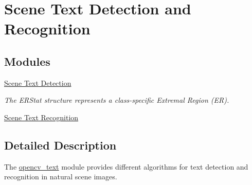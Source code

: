 \hypertarget{group__text}{}\section{Scene Text Detection and Recognition}
\label{group__text}
\subsection*{Modules}
\begin{DoxyCompactItemize}
\item 
\hyperlink{group__text__detect}{Scene Text Detection}
\begin{DoxyCompactList}\small\item\em The E\+R\+Stat structure represents a class-\/specific Extremal Region (ER). \end{DoxyCompactList}\item 
\hyperlink{group__text__recognize}{Scene Text Recognition}
\end{DoxyCompactItemize}


\subsection{Detailed Description}
The \hyperlink{classorg_1_1bytedeco_1_1javacpp_1_1opencv__text}{opencv\+\_\+text} module provides different algorithms for text detection and recognition in natural scene images. 